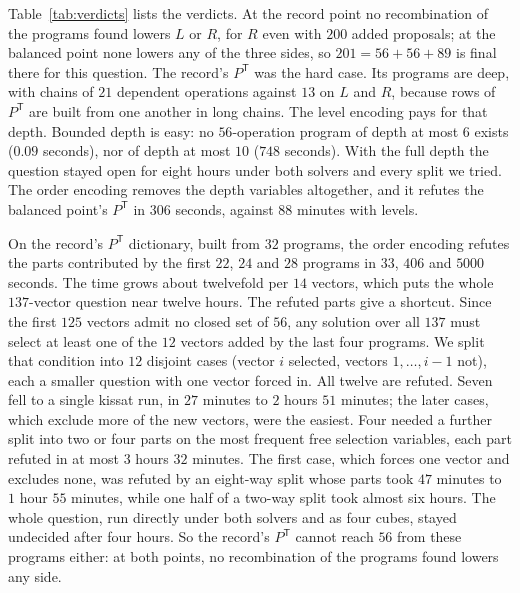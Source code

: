 \documentclass[11pt]{article}
\theoremstyle{remark}
\newcommand{\Pt}{P^{\mathsf T}}
\begin{document}
Table~\ref{tab:verdicts} lists the verdicts.  At the record point no
recombination of the programs found lowers $L$ or $R$, for $R$ even with
$200$ added proposals; at the balanced point none lowers any of the
three sides, so $201=56+56+89$ is final there for this question.  The
record's $\Pt$ was the hard case.  Its programs are deep, with chains of
$21$ dependent operations against $13$ on $L$ and $R$, because rows of
$\Pt$ are built from one another in long chains.  The level encoding
pays for that depth.  Bounded depth is easy: no $56$-operation program of
depth at most $6$ exists ($0.09$ seconds), nor of depth at most $10$
($748$ seconds).  With the full depth the question stayed open for eight
hours under both solvers and every split we tried.  The order encoding
removes the depth variables altogether, and it refutes the balanced
point's $\Pt$ in $306$ seconds, against $88$ minutes with levels.

On the record's $\Pt$ dictionary, built from $32$ programs, the order
encoding refutes the parts contributed by the first $22$, $24$ and $28$
programs in $33$, $406$ and $5000$ seconds.  The time grows about
twelvefold per $14$ vectors, which puts the whole $137$-vector question
near twelve hours.  The refuted parts give a shortcut.  Since the first
$125$ vectors admit no closed set of $56$, any solution over all $137$
must select at least one of the $12$ vectors added by the last four
programs.  We split that condition into $12$ disjoint cases (vector $i$
selected, vectors $1,\dots,i-1$ not), each a smaller question with one
vector forced in.  All twelve are refuted.  Seven fell to a single kissat
run, in $27$ minutes to $2$ hours $51$ minutes; the later cases, which
exclude more of the new vectors, were the easiest.  Four needed a further
split into two or four parts on the most frequent free selection
variables, each part refuted in at most $3$ hours $32$ minutes.  The
first case, which forces one vector and excludes none, was refuted by an
eight-way split whose parts took $47$ minutes to $1$ hour $55$ minutes,
while one half of a two-way split took almost six hours.  The whole question, run directly under
both solvers and as four cubes, stayed undecided after four hours.  So
the record's $\Pt$ cannot reach $56$ from these programs either: at both
points, no recombination of the programs found lowers any side.
\end{document}

